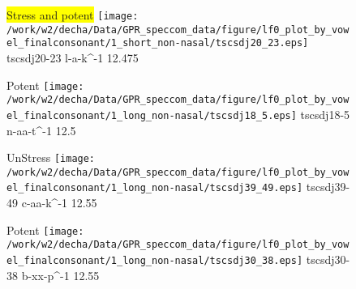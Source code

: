 \documentclass{article}
\begin{document}
\begin{figure}[t]
\begin{minipage}[b]{.24\textwidth}
\colorbox{yellow}{Stress and potent}
\centering
\texttt{[image: /work/w2/decha/Data/GPR\_speccom\_data/figure/lf0\_plot\_by\_vowel\_finalconsonant/1\_short\_non-nasal/tscsdj20\_23.eps]}
tscsdj20-23 l-a-k\textasciicircum-1 12.475
\end{minipage}
\begin{minipage}[b]{.24\textwidth}
\colorbox{Apricot}{Potent}
\centering
\texttt{[image: /work/w2/decha/Data/GPR\_speccom\_data/figure/lf0\_plot\_by\_vowel\_finalconsonant/1\_long\_non-nasal/tscsdj18\_5.eps]}
tscsdj18-5 n-aa-t\textasciicircum-1 12.5
\end{minipage}
\begin{minipage}[b]{.24\textwidth}
UnStress
\centering
\texttt{[image: /work/w2/decha/Data/GPR\_speccom\_data/figure/lf0\_plot\_by\_vowel\_finalconsonant/1\_long\_non-nasal/tscsdj39\_49.eps]}
tscsdj39-49 c-aa-k\textasciicircum-1 12.55
\end{minipage}
\begin{minipage}[b]{.24\textwidth}
\colorbox{Apricot}{Potent}
\centering
\texttt{[image: /work/w2/decha/Data/GPR\_speccom\_data/figure/lf0\_plot\_by\_vowel\_finalconsonant/1\_long\_non-nasal/tscsdj30\_38.eps]}
tscsdj30-38 b-xx-p\textasciicircum-1 12.55
\end{minipage}
\end{figure}
\end{document}
